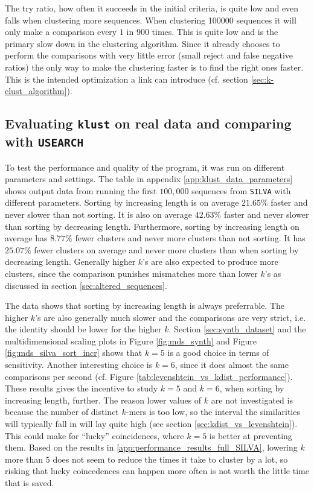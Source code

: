 The try ratio, how often it succeeds in the initial criteria, is quite low and
even falls when clustering more sequences. When clustering \num{100000}
sequences it will only make a comparison every $1$ in $900$ times. This is
quite low and is the primary slow down in the clustering algorithm. Since it
already chooses to perform the comparisons with very little error (small
reject and false negative ratios) the only way to make the clustering faster
is to find the right ones faster. This is the intended optimization a link can
introduce (cf. section \ref{sec:k-clust_algorithm}).


\subsection{Evaluating \texttt{klust} on real data and comparing with
            \texttt{USEARCH}}
\label{sec:evaluating_klust_real_data}

To test the performance and quality of the program, it was run on different
parameters and settings. The table in appendix \ref{app:klust_data_parameters}
shows output data from running the first $100,000$ sequences from
\texttt{SILVA} with different parameters. Sorting by increasing length is on
average $21.65\%$ faster and never slower than not sorting. It is also on
average $42.63\%$ faster and never slower than sorting by decreasing length.
Furthermore, sorting by increasing length on average has $8.77\%$ fewer
clusters and never more clusters than not sorting. It has $25.07\%$ fewer
clusters on average and never more clusters than when sorting by decreasing
length. Generally higher $k$'s are also expected to produce more clusters,
since the comparison punishes mismatches more than lower $k$'s as discussed in
section \ref{sec:altered_sequences}.

The data shows that sorting by increasing length is always preferrable. The
higher $k$'s are also generally much slower and the comparisons are very
strict, i.e. the identity should be lower for the higher $k$. Section
\ref{sec:synth_dataset} and the multidimensional scaling plots in Figure
\ref{fig:mds_synth} and Figure \ref{fig:mds_silva_sort_incr} shows that $k=5$
is a good choice in terms of sensitivity. Another interesting choice is $k=6$,
since it does almost the same comparisons per second (cf. Figure
\ref{tab:levenshtein_vs_kdist_performance}). These results gives the incentive
to study $k=5$ and $k=6$, when sorting by increasing length, further. The
reason lower values of $k$ are not investigated is because the number of
distinct $k$-mers is too low, so the interval the similarities will typically
fall in will lay quite high (see section \ref{sec:kdist_vs_levenshtein}). This
could make for ``lucky'' coincidences, where $k=5$ is better at preventing
them. Based on the results in \ref{app:performance_results_full_SILVA},
lowering $k$ more than $5$ does not seem to reduce the times it take to
cluster by a lot, so risking that lucky coincedences can happen more often is
not worth the little time that is saved.

